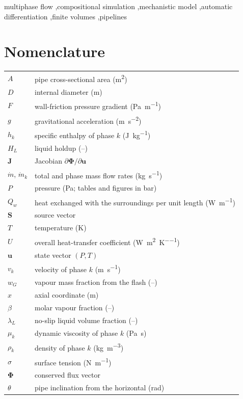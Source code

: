\documentclass[a4paper,fleqn]{cas-sc}
\newcommand{\mdot}{\dot{m}}
\newcommand{\bPhi}{\boldsymbol{\Phi}}
\newcommand{\bS}{\mathbf{S}}
\newcommand{\bu}{\mathbf{u}}
\newcommand{\bJ}{\mathbf{J}}
\begin{document}
\begin{keywords}
multiphase flow \sep compositional simulation \sep mechanistic model \sep automatic differentiation \sep finite volumes \sep pipelines
\end{keywords}

\maketitle

\section*{Nomenclature}
\begin{tabular}{@{}ll@{}}
$A$ & pipe cross-sectional area (\si{\metre\squared}) \\
$D$ & internal diameter (\si{\metre}) \\
$F$ & wall-friction pressure gradient (\si{\pascal\per\metre}) \\
$g$ & gravitational acceleration (\si{\metre\per\second\squared}) \\
$h_k$ & specific enthalpy of phase $k$ (\si{\joule\per\kilogram}) \\
$H_L$ & liquid holdup (--) \\
$\bJ$ & Jacobian $\partial\bPhi/\partial\bu$ \\
$\mdot$, $\mdot_k$ & total and phase mass flow rates (\si{\kilogram\per\second}) \\
$P$ & pressure (\si{\pascal}; tables and figures in bar) \\
$Q_w$ & heat exchanged with the surroundings per unit length (\si{\watt\per\metre}) \\
$\bS$ & source vector \\
$T$ & temperature (\si{\kelvin}) \\
$U$ & overall heat-transfer coefficient (\si{\watt\per\metre\squared\per\kelvin}) \\
$\bu$ & state vector $(P, T)$ \\
$v_k$ & velocity of phase $k$ (\si{\metre\per\second}) \\
$w_G$ & vapour mass fraction from the flash (--) \\
$x$ & axial coordinate (\si{\metre}) \\
$\beta$ & molar vapour fraction (--) \\
$\lambda_L$ & no-slip liquid volume fraction (--) \\
$\mu_k$ & dynamic viscosity of phase $k$ (\si{\pascal\second}) \\
$\rho_k$ & density of phase $k$ (\si{\kilogram\per\metre\cubed}) \\
$\sigma$ & surface tension (\si{\newton\per\metre}) \\
$\bPhi$ & conserved flux vector \\
$\theta$ & pipe inclination from the horizontal (\si{\radian}) \\
\end{tabular}
\end{document}
